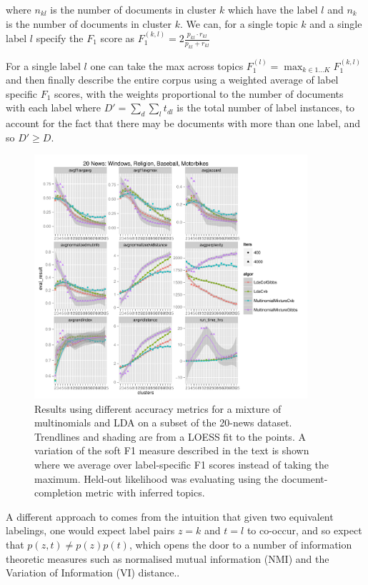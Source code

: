 where $n_{kl}$ is the number of documents in cluster $k$ which have the label $l$ and $n_k$ is the number of documents in cluster $k$. We can, for a single topic $k$ and a single label $l$ specify the $F_1$ score as $F_1^{(k,l)} = 2 \frac{p_{kl} \cdot {r_{kl}}}{p_{kl} + {r_{kl}}}$

For a single label $l$ one can take the max across topics $F_1^{(l)} = \max_{k \in 1\ldots K} F_1^{(k,l)}$ and then finally describe the entire corpus using a weighted average of label specific $F_1$ scores, with the weights proportional to the number of documents with each label where $D' = \sum_d \sum_l t_{dl}$ is the total number of label instances, to account for the fact that there may be documents with more than one label, and so $D' \geq D$.


\begin{figure}
  \centering
    \includegraphics[width=0.9\textwidth]{../Chap3a/plots/20news-2013-03-25.pdf}
  \caption{Results using different accuracy metrics for a mixture of multinomials and LDA on a subset of the 20-news dataset. Trendlines and shading are from a LOESS fit to the points. A variation of the soft F1 measure described in the text is shown where we average over label-specific F1 scores instead of taking the maximum. Held-out likelihood was evaluating using the document-completion metric with inferred topics.}
  \label{fig:eval-metrics-shootout}
\end{figure}


A different approach to comes from the intuition that given two equivalent labelings, one would expect label pairs $z=k$ and $t=l$ to co-occur, and so expect that $p(z,t) \neq p(z)p(t)$, which opens the door to a number of information theoretic measures such as normalised mutual information (NMI) and the Variation of Information (VI) distance..

